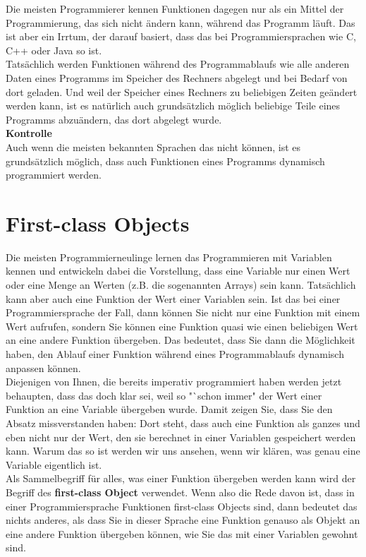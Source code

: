 Die meisten Programmierer kennen Funktionen dagegen nur als ein Mittel der Programmierung, das sich nicht ändern kann, während das Programm läuft. Das ist aber ein Irrtum, der darauf basiert, dass das bei Programmiersprachen wie C, C++ oder Java so ist.\\

Tatsächlich werden Funktionen während des Programmablaufs wie alle anderen Daten eines Programms im Speicher des Rechners abgelegt und bei Bedarf von dort geladen. Und weil der Speicher eines Rechners zu beliebigen Zeiten geändert werden kann, ist es natürlich auch grundsätzlich möglich beliebige Teile eines Programms abzuändern, das dort abgelegt wurde.\\

\textbf{Kontrolle}\\
Auch wenn die meisten bekannten Sprachen das nicht können, ist es grundsätzlich möglich, dass auch Funktionen eines Programms dynamisch programmiert werden. 

\section{First-class Objects}
Die meisten Programmierneulinge lernen das Programmieren mit Variablen kennen und entwickeln dabei die Vorstellung, dass eine Variable nur einen Wert oder eine Menge an Werten (z.B. die sogenannten Arrays) sein kann. Tatsächlich kann aber auch eine Funktion der Wert einer Variablen sein. Ist das bei einer Programmiersprache der Fall, dann können Sie nicht nur eine Funktion mit einem Wert aufrufen, sondern Sie können eine Funktion quasi wie einen beliebigen Wert an eine andere Funktion übergeben. Das bedeutet, dass Sie dann die Möglichkeit haben, den Ablauf einer Funktion während eines Programmablaufs dynamisch anpassen können.\\

Diejenigen von Ihnen, die bereits imperativ programmiert haben werden jetzt behaupten, dass das doch klar sei, weil so "`schon immer" der Wert einer Funktion an eine Variable übergeben wurde. Damit zeigen Sie, dass Sie den Absatz missverstanden haben: Dort steht, dass auch eine Funktion als ganzes und eben nicht nur der Wert, den sie berechnet in einer Variablen gespeichert werden kann. Warum das so ist werden wir uns ansehen, wenn wir klären, was genau eine Variable eigentlich ist.\\

Als Sammelbegriff für alles, was einer Funktion übergeben werden kann wird der Begriff des \textbf{first-class Object} verwendet. Wenn also die Rede davon ist, dass in einer Programmiersprache Funktionen first-class Objects sind, dann bedeutet das nichts anderes, als dass Sie in dieser Sprache eine Funktion genauso als Objekt an eine andere Funktion übergeben können, wie Sie das mit einer Variablen gewohnt sind.\\

